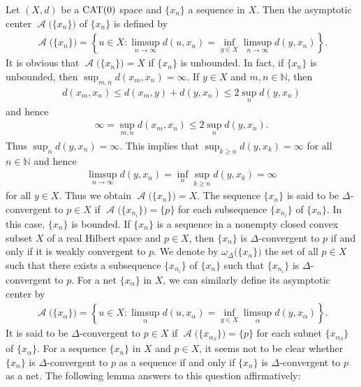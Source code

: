 \documentclass[draft]{amsart}
\numberwithin{equation}{section}
\def\N{\mathbb N}
\DeclareMathOperator{\AC}{\mathcal{A}}
\newcommand{\CAT}{\textup{CAT}}
\theoremstyle{plain}
\theoremstyle{definition}
\theoremstyle{remark}
\begin{document}
Let $(X,d)$ be a $\CAT(0)$ space and 
$\{x_n\}$ a sequence in $X$. Then 
the asymptotic center $\AC\bigl(\{x_n\}\bigr)$ of 
$\{x_n\}$ is defined by 
\begin{align}
 \AC\bigl(\{x_n\}\bigr) 
 = \left\{
 u\in X: \limsup_{n\to \infty}d(u, x_n) = \inf_{y\in X} 
 \limsup_{n\to \infty} d(y, x_n)
 \right\}. 
\end{align}
It is obvious that $\AC\bigl(\{x_n\}\bigr)=X$ 
if $\{x_n\}$ is unbounded. 
In fact, if $\{x_n\}$ is unbounded, then 
$\sup_{m,n} d(x_m,x_n) = \infty$.  
If $y\in X$ and $m,n\in \N$, then 
\begin{align}
 d(x_m, x_n) \leq d(x_m, y)+d(y, x_n) \leq 2 \sup _{n}d(y, x_n) 
\end{align}
and hence 
\begin{align}
 \infty = \sup_{m,n} d(x_m,x_n) \leq 2 \sup _{n}d(y, x_n). 
\end{align}
Thus $\sup_{n}d(y, x_n)=\infty$. This implies that $\sup_{k\geq n}d(y, x_k)=\infty$ 
for all $n\in \N$ and hence 
\begin{align}
 \limsup_{n\to \infty} d(y, x_n) = \inf_{n} \sup_{k\geq n} d(y, x_k) = \infty
\end{align}
for all $y\in X$. Thus we obtain $\AC\bigl(\{x_n\}\bigr)=X$. 
\fi
The sequence $\{x_n\}$ is said to be $\Delta$-convergent to $p\in X$ 
if $\AC\bigl(\{x_{n_i}\}\bigr) =\{p\}$ 
for each subsequence $\{x_{n_i}\}$ of $\{x_n\}$. 
In this case, $\{x_n\}$ is bounded. 
If $\{x_n\}$ is a sequence in 
a nonempty closed convex subset $X$ of a real Hilbert space 
and $p\in X$, then 
$\{x_n\}$ is $\Delta$-convergent to $p$ 
if and only if it is weakly convergent to $p$. 
We denote by $\omega_{\Delta}\bigl(\{x_n\}\bigr)$ 
the set of all $p\in X$ such that 
there exists a subsequence $\{x_{n_i}\}$ of $\{x_n\}$ 
such that $\{x_{n_i}\}$ is $\Delta$-convergent to $p$. 
For a net $\{x_{\alpha}\}$ in $X$, we can 
similarly define its asymptotic center by 
\begin{align}
 \AC\bigl(\{x_{\alpha}\}\bigr) 
 = \left\{
 u\in X: \limsup_{\alpha}d(u, x_{\alpha}) 
 = \inf_{y\in X} 
 \limsup_{\alpha} d(y, x_{\alpha})
 \right\}. 
\end{align}
It is said to be $\Delta$-convergent to $p\in X$ if 
$\AC\bigl(\{x_{\alpha_{\beta}}\}\bigr)=\{p\}$ 
for each subnet $\{x_{\alpha_{\beta}}\}$ of 
$\{x_{\alpha}\}$. 
For a sequence $\{x_n\}$ in $X$ and $p\in X$, 
it seems not to be clear whether 
$\{x_n\}$ is $\Delta$-convergent to $p$ 
as a sequence if and only if 
$\{x_n\}$ is $\Delta$-convergent to $p$ 
as a net. The following lemma answers to this question 
affirmatively: 
\end{document}
